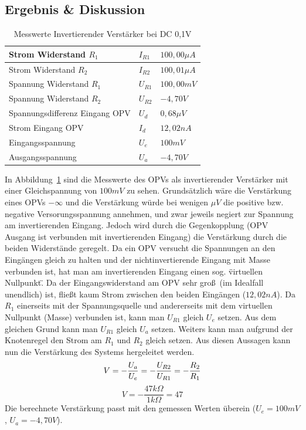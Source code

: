\documentclass[12pt,a4paper,titlepage]{article}
\begin{document}
\subsection{Ergebnis \& Diskussion}
\begin{table}[H]
\centering
\begin{tabular}{|l|l|l|}
\hline
Strom Widerstand $R_1$ & $I_{R1}$ & $100,00\mu A$  \\ \hline
Strom Widerstand $R_2$ & $I_{R2}$ & $100,01\mu A$  \\ \hline
Spannung Widerstand $R_1$ & $U_{R1}$ & $100,00mV$  \\ \hline
Spannung Widerstand $R_2$ & $U_{R2}$ & $-4,70V$ \\ \hline
Spannungsdifferenz Eingang OPV & $U_d$  & $0,68\mu V$      \\ \hline
Strom Eingang OPV & $I_d$  & $12,02nA$ \\ \hline
Eingangsspannung & $U_e$  & $100mV$        \\ \hline
Ausgangsspannung & $U_a$  & $-4,70V$   \\ \hline
\end{tabular}
\caption{Messwerte Invertierender Verst\"arker bei DC 0,1V}
\label{figure12}
\end{table}
In Abbildung~\ref{figure12} sind die Messwerte des OPVs als invertierender Verst\"arker mit einer Gleichspannung von $100mV$ zu sehen. Grunds\"atzlich w\"are die Verst\"arkung eines OPVs $-\infty$ und die Verst\"arkung w\"urde bei wenigen $\mu V$ die positive bzw. negative Versorungsspannung annehmen, und zwar jeweils negiert zur Spannung am invertierenden Eingang. Jedoch wird durch die Gegenkopplung (OPV Ausgang ist verbunden mit invertierenden Eingang) die Verst\"arkung durch die beiden Widerst\"ande geregelt. Da ein OPV versucht die Spannungen an den Eing\"angen gleich zu halten und der nichtinvertierende Eingang mit Masse verbunden ist, hat man am invertierenden Eingang einen sog. \"virtuellen Nullpunkt\". Da der Eingangswiderstand am OPV sehr gro\ss \, (im Idealfall unendlich) ist, flie\ss t kaum Strom zwischen den beiden Eing\"angen ($12,02nA$). Da $R_1$ einerseits mit der Spannungsquelle und andererseits mit dem virtuellen Nullpunkt (Masse) verbunden ist, kann man $U_{R1}$ gleich $U_e$ setzen. Aus dem gleichen Grund kann man $U_{R1}$ gleich $U_a$ setzen. Weiters kann man aufgrund der Knotenregel den Strom am $R_1$ und $R_2$ gleich setzen. Aus diesen Aussagen kann nun die Verst\"arkung des Systems hergeleitet werden.
\begin{equation*}
  V = -\frac{U_a}{U_e} = -\frac{U_{R2}}{U_{R1}} = -\frac{R_2}{R_1} \\
\end{equation*}
\begin{equation*}
  V = -\frac{47 k\Omega}{1 k\Omega} = 47
\end{equation*}
\noindent Die berechnete Verst\"arkung passt mit den gemessen Werten \"uberein ($U_e = 100mV$, $U_a = -4,70V$).
\end{document}
